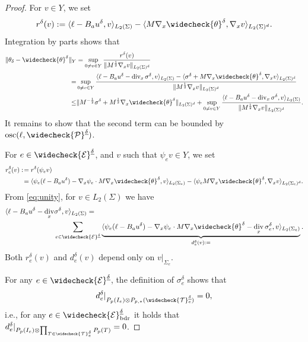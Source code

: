 \documentclass{amsart}
\newcommand{\osc}{{\rm osc}}
\numberwithin{equation}{section}
\newcommand{\cE}{\mathcal E}
\newcommand{\1}{\mathbb 1}
\DeclareMathOperator{\divv}{div}
\newcommand{\be}{\begin{equation}}
\newcommand{\ee}{\end{equation}}
\newcommand{\tria}{{\mathcal T}}
\newcommand{\pria}{{\mathcal P}}
\begin{document}
\begin{proof}
For $v \in Y$, we set
$$
r^\delta(v):=
\langle \ell - B_a u^\delta,v\rangle_{L_2(\Sigma)}-\langle M \nabla_x \widecheck{\theta}^\delta, \nabla_x v \rangle_{L_2(\Sigma)^d}.
$$
Integration by parts shows that
\begin{align*}
 \|\theta_\delta-\widecheck{\theta}^\delta\|_Y&=\sup_{0 \neq v \in Y}   \frac{r^\delta(v)}{\|M^{\frac12}\nabla_x v\|_{L_2(\Sigma)^d}}\\
 =&\sup_{0 \neq v \in Y}   \frac{\langle \ell - B_a u^\delta-\divv_x \sigma^\delta,v\rangle_{L_2(\Sigma)}-\langle \sigma^\delta+M \nabla_x \widecheck{\theta}^\delta, \nabla_x v \rangle_{L_2(\Sigma)^d}}
{\|M^{\frac12}\nabla_x v\|_{L_2(\Sigma)^d}}\\
 \leq&  \|M^{-\frac12} \sigma^\delta+M^{\frac12} \nabla_x \widecheck{\theta}^\delta\|_{L_2(\Sigma)^d}+\sup_{0 \neq v \in Y}  
\frac{ \langle \ell - B_a u^\delta-\divv_x \sigma^\delta,v\rangle_{L_2(\Sigma)}}{\|M^{\frac12} \nabla_x v\|_{L_2(\Sigma)^d}}.
\end{align*}
It remains to show that the second term can be bounded by $\osc(\ell,\widecheck{\pria}^{\underline{\delta}})$.

For $e \in \widecheck{\cE}^{\underline{\delta}}$, and $v$ such that $\psi_e v \in Y$, we set
\be
\begin{split} \label{eq:g4}
r_e^\delta(v):\!&=r^\delta(\psi_e v)\\
& =
\langle \psi_e(\ell - B_a u^\delta) -\nabla_x \psi_e \cdot M \nabla_x \widecheck{\theta}^\delta,v\rangle_{L_2(\Sigma_e)}-\langle \psi_e M \nabla_x \widecheck{\theta}^\delta, \nabla_x v \rangle_{L_2(\Sigma_e)^d}.
\end{split}
\ee
From \eqref{eq:unity}, for $v \in L_2(\Sigma)$ we have
\be \label{eq:g10}
\begin{split}
\langle \ell - B_a u^\delta-\divv_x &\sigma^\delta,v\rangle_{L_2(\Sigma)}=\\
& \sum_{e  \in \widecheck{\cE}^{\underline{\delta}}} \underbrace{\langle \psi_e(\ell - B_a u^\delta) -\nabla_x \psi_e \cdot M \nabla_x \widecheck{\theta}^\delta-\divv_x \sigma_{e}^\delta,v\rangle_{L_2(\Sigma_e)}}_{d_e^\delta(v):=}.
\end{split}
\ee
Both $r_e^\delta(v)$ and $d_e^\delta(v)$ depend only on $v|_{\Sigma_e}$.

For any $e \in \widecheck{\cE}^{\underline{\delta}}$, the definition of $\sigma_e^\delta$ shows that
\be \label{eq:g11}
d_e^\delta|_{P_p(I_e) \otimes P_{p,*}(\widecheck\tria^{\underline{\delta}}_e)}=0,
\ee
i.e., for any $e \in \widecheck{\cE}_{\rm bdr}^{\underline{\delta}}$ it holds that $d_e^\delta|_{P_p(I_e) \otimes \prod_{T \in \widecheck\tria_e^\delta} P_{p}(T)}=0$.


\end{proof}
\end{document}

